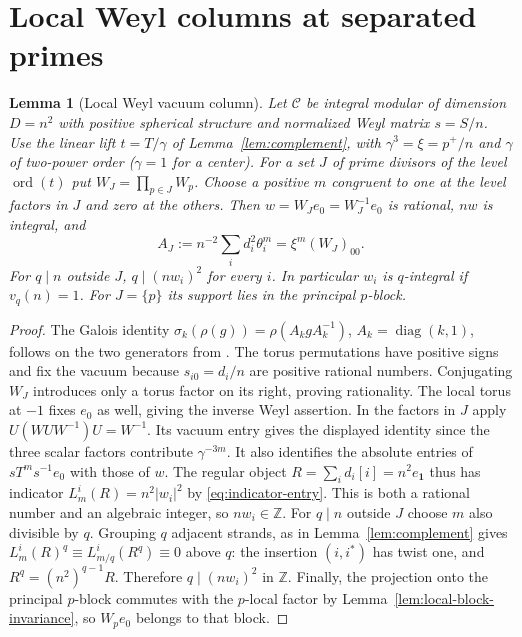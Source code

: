 \documentclass[11pt,a4paper]{article}
\numberwithin{equation}{section}
\newtheorem{lemma}[theorem]{Lemma}
\theoremstyle{remark}
\newcommand{\C}{\mathcal C}
\newcommand{\one}{\mathbf1}
\newcommand{\ZZ}{\mathbb Z}
\DeclareMathOperator{\ord}{ord}
\begin{document}
\section{Local Weyl columns at separated primes}\label{fam:M:sec:6}\label{subsec:sqvac}
\begin{lemma}[Local Weyl vacuum column]\label{fam:M:6.1}\label{lem:local-vacuum-column}
Let $\C$ be integral modular of dimension $D=n^2$ with positive
spherical structure and normalized Weyl matrix $s=S/n$. Use the
linear lift $t=T/\gamma$ of Lemma~\ref{lem:complement}, with
$\gamma^3=\xi=p^+/n$ and $\gamma$ of two-power order
($\gamma=1$ for a center). For a set $J$ of prime divisors of the
level $\ord(t)$ put $W_J=\prod_{p\in J}W_p$. Choose a positive $m$
congruent to one at the level factors in $J$ and zero at the others.
Then $w=W_Je_0=W_J^{-1}e_0$ is rational, $nw$ is integral, and
\[
 A_J:=n^{-2}\sum_i d_i^2\theta_i^m=\xi^m (W_J)_{00}.
\]
For $q\mid n$ outside $J$, $q\mid(nw_i)^2$ for every $i$.
In particular $w_i$ is $q$-integral if $v_q(n)=1$.
For $J=\{p\}$ its support lies in the principal $p$-block.
\end{lemma}
\begin{proof}
The Galois identity
$\sigma_k(\rho(g))=\rho(A_k g A_k^{-1})$,
$A_k=\operatorname{diag}(k,1)$, follows on the two generators from
\cite[Theorem~II and Remark~4.5]{DLNCongruence}. The torus permutations
have positive signs and fix the vacuum because $s_{i0}=d_i/n$ are
positive rational numbers. Conjugating $W_J$ introduces only a torus
factor on its right, proving rationality. The local torus at $-1$
fixes $e_0$ as well, giving the inverse Weyl assertion.
In the factors in $J$ apply $U(WUW^{-1})U=W^{-1}$. Its vacuum
entry gives the displayed identity since the three scalar factors
contribute $\gamma^{-3m}$. It also identifies the absolute entries
of $sT^m s^{-1}e_0$ with those of $w$. The regular object
$R=\sum_i d_i[i]=n^2 e_{\one}$ thus has indicator
$L_m^i(R)=n^2|w_i|^2$ by \eqref{eq:indicator-entry}. This is both a
rational number and an algebraic integer, so $nw_i\in\ZZ$.
For $q\mid n$ outside $J$ choose $m$ also divisible by $q$. Grouping
$q$ adjacent strands, as in Lemma~\ref{lem:complement} gives
$L_m^i(R)^q\equiv L_{m/q}^i(R^q)\equiv0$ above $q$:
the insertion $(i,i^*)$ has twist one, and
$R^q=(n^2)^{q-1}R$. Therefore $q\mid(nw_i)^2$ in $\ZZ$.
Finally, the projection onto the principal $p$-block commutes with the
$p$-local factor by Lemma~\ref{lem:local-block-invariance}, so
$W_pe_0$ belongs to that block.
\end{proof}
\end{document}
